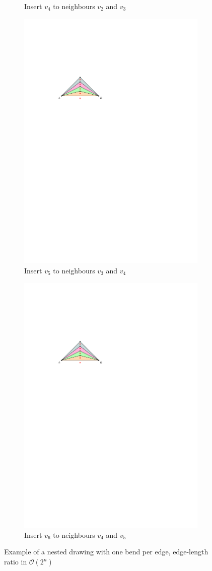 \begin{figure}[H]
\begin{subfigure}{0.4\textwidth}
\caption{Insert $v_4$ to neighbours $v_2$ and $v_3$}
\end{subfigure}
\begin{subfigure}{0.4\textwidth}
	\centering
	\includegraphics[width=.7\linewidth,page=7]{drawings/k-trees.pdf}
	\caption{Insert $v_5$ to neighbours $v_3$ and $v_4$}
\end{subfigure}

\begin{subfigure}{0.4\textwidth}
	\centering
	\includegraphics[width=.7\linewidth,page=8]{drawings/k-trees.pdf}
	\caption{Insert $v_6$ to neighbours $v_4$ and $v_5$}
\end{subfigure}
\caption{Example of a nested drawing with one bend per edge, edge-length ratio in $\mathcal{O}(2^n)$}
\end{figure}
